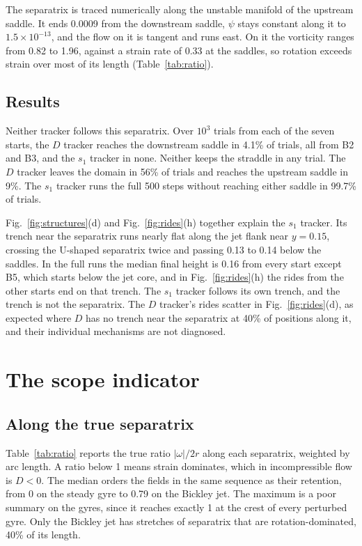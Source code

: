 \documentclass[11pt]{article}
\newcommand{\Dtr}{$D$ tracker}
\newcommand{\Str}{$s_1$ tracker}
\begin{document}
The separatrix is traced numerically along the unstable manifold of the
upstream saddle. It ends 0.0009 from the downstream saddle, $\psi$ stays
constant along it to $1.5 \times 10^{-13}$, and the flow on it is tangent
and runs east. On it the vorticity ranges from 0.82 to 1.96, against a
strain rate of 0.33 at the saddles, so rotation exceeds strain over most
of its length (Table~\ref{tab:ratio}).

\subsection{Results}

Neither tracker follows this separatrix. Over $10^3$ trials from each of
the seven starts, the \Dtr{} reaches the downstream saddle in 4.1\% of
trials, all from B2 and B3, and the \Str{} in none. Neither keeps the
straddle in any trial. The \Dtr{} leaves the domain in 56\% of trials and
reaches the upstream saddle in 9\%. The \Str{} runs the full 500 steps
without reaching either saddle in 99.7\% of trials.

Fig.~\ref{fig:structures}(d) and Fig.~\ref{fig:rides}(h) together explain
the \Str{}. Its trench near the separatrix runs nearly flat along the jet
flank near $y = 0.15$, crossing the U-shaped separatrix twice and passing
0.13 to 0.14 below the saddles. In the full runs the median final height
is 0.16 from every start except B5, which starts below the jet core, and
in Fig.~\ref{fig:rides}(h) the rides from the other starts end on that
trench. The \Str{} follows its own trench, and the trench is not the
separatrix. The \Dtr{}'s rides scatter in Fig.~\ref{fig:rides}(d), as
expected where $D$ has no trench near the separatrix at 40\% of
positions along it, and their individual mechanisms are not diagnosed.

\section{The scope indicator}
\label{sec:scope_notes}

\subsection{Along the true separatrix}

Table~\ref{tab:ratio} reports the true ratio $|\omega|/2r$ along each
separatrix, weighted by arc length. A ratio below 1 means strain
dominates, which in incompressible flow is $D < 0$. The median orders the
fields in the same sequence as their retention, from 0 on the steady gyre
to 0.79 on the Bickley jet. The maximum is a poor summary on the gyres,
since it reaches exactly 1 at the crest of every perturbed gyre. Only the
Bickley jet has stretches of separatrix that are rotation-dominated, 40\%
of its length.
\end{document}

